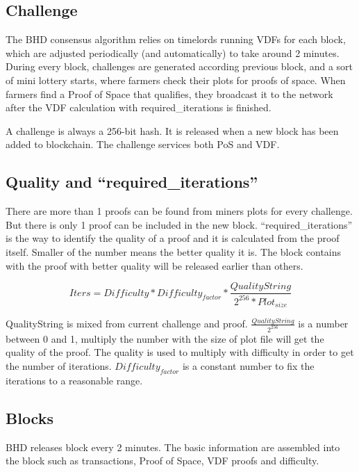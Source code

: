 \subsection{Challenge}
\begin{flushleft}
    The BHD consensus algorithm relies on timelords running VDFs for each block, which are adjusted periodically (and automatically) to take around 2 minutes. During every block, challenges are generated according previous block, and a sort of mini lottery starts, where farmers check their plots for proofs of space. When farmers find a Proof of Space that qualifies, they broadcast it to the network after the VDF calculation with required\_iterations is finished.
\end{flushleft}
\begin{flushleft}
    A challenge is always a 256-bit hash. It is released when a new block has been added to blockchain. The challenge services both PoS and VDF.
\end{flushleft}
\subsection{Quality and ``required\_iterations''}
\begin{flushleft}
    There are more than 1 proofs can be found from miners plots for every challenge. But there is only 1 proof can be included in the new block. ``required\_iterations'' is the way to identify the quality of a proof and it is calculated from the proof itself. Smaller of the number means the better quality it is. The block contains with the proof with better quality will be released earlier than others.
\end{flushleft}
\begin{equation}
    Iters = Difficulty * Difficulty_{factor} * \frac{QualityString}{2^{256} * Plot_{size}}
\end{equation}
\begin{flushleft}
    QualityString is mixed from current challenge and proof. $\frac{QualityString}{2^{256}}$ is a number between 0 and 1, multiply the number with the size of plot file will get the quality of the proof. The quality is used to multiply with difficulty in order to get the number of iterations. $Difficulty_{factor}$ is a constant number to fix the iterations to a reasonable range.
\end{flushleft}
\subsection{Blocks}
\begin{flushleft}
    BHD releases block every 2 minutes. The basic information are assembled into the block such as transactions, Proof of Space, VDF proofs and difficulty.
\end{flushleft}
